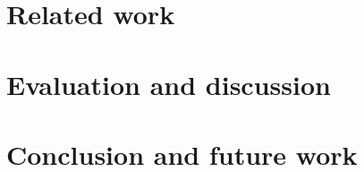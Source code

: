 \documentclass[USenglish]{uit-thesis}
\begin{document}
\chapter{Related work}


\chapter{Evaluation and discussion}


\chapter{Conclusion and future work}


\printbibliography

\backmatter
\end{document}
